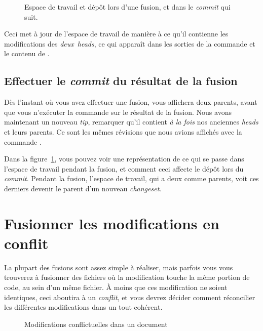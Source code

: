 \begin{figure}[ht]
  \centering
  \caption{Espace de travail et dépôt lors d'une fusion, et dans le
    \textit{commit} qui suit.}
  \label{fig:tour-merge:merge}
\end{figure}

Ceci met à jour de l'espace de travail de manière à ce qu'il contienne
les modifications des \emph{deux} \textit{heads}, ce qui apparaît dans
les sorties de la commande  et le contenu de 
. 

\subsection{Effectuer le \textit{commit} du résultat de la fusion}

Dès l'instant où vous avez effectuer une fusion,  vous
affichera deux parents, avant que vous n'exécuter la commande 
 sur le résultat de la fusion.
Nous avons maintenant un nouveau \textit{tip}, remarquer qu'il contient
\emph{à la fois} nos anciennes \textit{heads} et leurs parents. Ce sont
les mêmes révisions que nous avions affichés avec la commande 
.

Dans la figure~\ref{fig:tour-merge:merge}, vous pouvez voir une représentation
de ce qui se passe dans l'espace de travail pendant la fusion, et comment ceci
affecte le dépôt lors du \textit{commit}. Pendant la fusion, l'espace de travail,
qui a deux  comme parents, voit ces derniers devenir le parent
d'un nouveau \textit{changeset}.

\section{Fusionner les modifications en conflit}

La plupart des fusions sont assez simple à réaliser, mais parfois 
vous vous trouverez à fusionner des fichiers où la modification touche
la même portion de code, au sein d'un même fichier. À moins que ces
modification ne soient identiques, ceci aboutira à un \emph{conflit},
et vous devrez décider comment réconcilier les différentes modifications
dans un tout cohérent. 

\begin{figure}[ht]
  \centering
  \caption{Modifications conflictuelles dans un document}
  \label{fig:tour-merge:conflict}
\end{figure}

